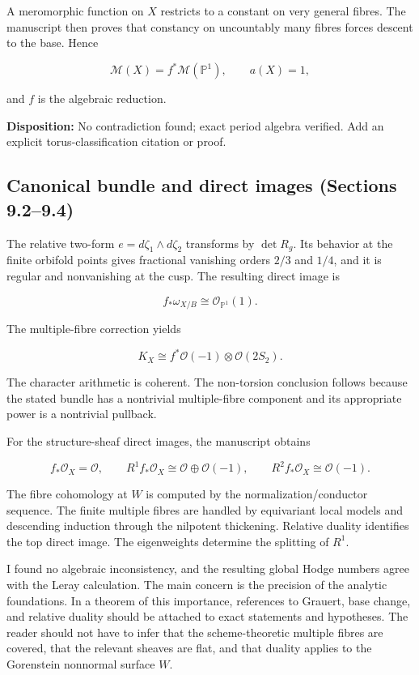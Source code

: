 \documentclass[
  10pt,
  letterpaper,
]{article}
\newcommand{\Pone}{\mathbb P^1}
\newcommand{\cO}{\mathcal O}
\begin{document}
A meromorphic function on \(X\) restricts to a constant on very general
fibres. The manuscript then proves that constancy on uncountably many
fibres forces descent to the base. Hence

\[
\mathcal M(X)=f^*\mathcal M(\Pone),
\qquad a(X)=1,
\]

and \(f\) is the algebraic reduction.

\textbf{Disposition:} No contradiction found; exact period algebra
verified. Add an explicit torus-classification citation or proof.

\subsection{Canonical bundle and direct images (Sections
9.2--9.4)}\label{canonical-bundle-and-direct-images-sections-9.29.4}

The relative two-form \(e=d\zeta_1\wedge d\zeta_2\) transforms by
\(\det R_g\). Its behavior at the finite orbifold points gives
fractional vanishing orders \(2/3\) and \(1/4\), and it is regular and
nonvanishing at the cusp. The resulting direct image is

\[
f_*\omega_{X/B}\cong\cO_{\Pone}(1).
\]

The multiple-fibre correction yields

\[
K_X\cong f^*\cO(-1)\otimes\cO(2S_2).
\]

The character arithmetic is coherent. The non-torsion conclusion follows
because the stated bundle has a nontrivial multiple-fibre component and
its appropriate power is a nontrivial pullback.

For the structure-sheaf direct images, the manuscript obtains

\[
f_*\cO_X=\cO,
\qquad
R^1f_*\cO_X\cong\cO\oplus\cO(-1),
\qquad
R^2f_*\cO_X\cong\cO(-1).
\]

The fibre cohomology at \(W\) is computed by the normalization/conductor
sequence. The finite multiple fibres are handled by equivariant local
models and descending induction through the nilpotent thickening.
Relative duality identifies the top direct image. The eigenweights
determine the splitting of \(R^1\).

I found no algebraic inconsistency, and the resulting global Hodge
numbers agree with the Leray calculation. The main concern is the
precision of the analytic foundations. In a theorem of this importance,
references to Grauert, base change, and relative duality should be
attached to exact statements and hypotheses. The reader should not have
to infer that the scheme-theoretic multiple fibres are covered, that the
relevant sheaves are flat, and that duality applies to the Gorenstein
nonnormal surface \(W\).
\end{document}
